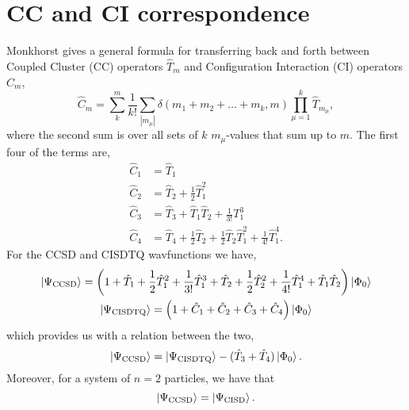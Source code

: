 \section{CC and CI correspondence}
\label{app:cc_vs_ci}

Monkhorst \cite{monkhorst1977calculation} gives a general formula for transferring 
back and forth between Coupled Cluster (CC) operators $\hat{T}_m$ and
Configuration Interaction (CI) operators $\hat{C}_m$,
\begin{equation}
    \hat{C}_m = \sum_{k}^m\frac{1}{k!}\sum_{|m_\mu|}
        \delta(m_1 + m_2 + \dots + m_k, m) \prod_{\mu=1}^k\hat{T}_{m_\mu},
\end{equation}
where the second sum is over all sets of $k$ $m_\mu$-values that sum up to $m$.
The first four of the terms are,
\begin{align}
    \hat{C}_1 &= \hat{T}_1 \\
    \hat{C}_2 &= \hat{T}_2 + \frac{1}{2} \hat{T}_1^2 \\
    \hat{C}_3 &= \hat{T}_3 + \hat{T}_1\hat{T}_2 + \frac{1}{3!} T_1^3 \\
    \hat{C}_4 &= \hat{T}_4 + \frac{1}{2}\hat{T}_2
        + \frac{1}{2}\hat{T}_2\hat{T}_1^2 + \frac{1}{4!}\hat{T}_1^4.
\end{align}
For the CCSD and CISDTQ wavfunctions we have,
\begin{gather}
    \ket{\Psi_{\text{CCSD}}} = \left(
        1 + \hat{T}_1 + \frac{1}{2}\hat{T}_1^2 + \frac{1}{3!}\hat{T}_1^3 
        + \hat{T}_2 + \frac{1}{2}\hat{T}_2^2 + \frac{1}{4!}\hat{T}_1^4 
        + \hat{T}_1\hat{T}_2 
    \right) \ket{\Phi_0} \\
    \ket{\Psi_{\text{CISDTQ}}} = \left(
        1 + \hat{C}_1 + \hat{C}_2  + \hat{C}_3 + \hat{C}_4
    \right)\ket{\Phi_0}
\end{gather}
which provides us with a relation between the two,
\begin{equation}
    \ket{\Psi_{\text{CCSD}}} 
        = \ket{\Psi_{\text{CISDTQ}}} - (\hat{T}_3 + \hat{T}_4)\ket{\Phi_0}.
\end{equation}
Moreover, for a system of $n=2$ particles, we have that
\begin{equation}
    \ket{\Psi_{\text{CCSD}}} = \ket{\Psi_{\text{CISD}}}.
\end{equation}
